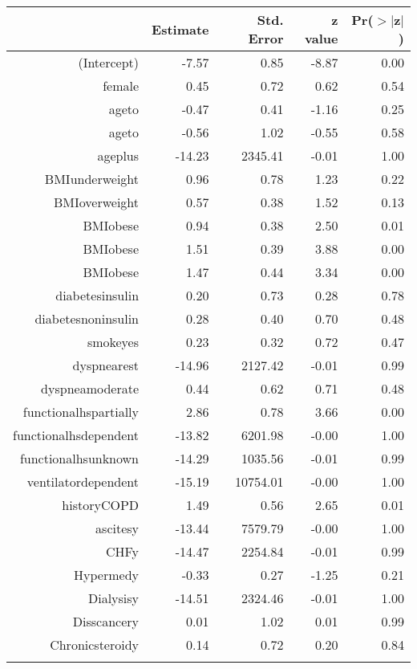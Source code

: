 \bigskip\bigskip
\centering
\begin{tabular}{rrrrr}
  \hline
 & Estimate & Std. Error & z value & Pr($>$$|$z$|$) \\ 
  \hline
(Intercept) & -7.57 & 0.85 & -8.87 & 0.00 \\ 
  female & 0.45 & 0.72 & 0.62 & 0.54 \\ 
  age\-65\-to\-74 & -0.47 & 0.41 & -1.16 & 0.25 \\ 
  age\-75\-to\-84 & -0.56 & 1.02 & -0.55 & 0.58 \\ 
  age\-85\-plus & -14.23 & 2345.41 & -0.01 & 1.00 \\ 
  BMI\-underweight & 0.96 & 0.78 & 1.23 & 0.22 \\ 
  BMI\-overweight & 0.57 & 0.38 & 1.52 & 0.13 \\ 
  BMI\-obese\-1 & 0.94 & 0.38 & 2.50 & 0.01 \\ 
  BMI\-obese\-2 & 1.51 & 0.39 & 3.88 & 0.00 \\ 
  BMI\-obese\-3 & 1.47 & 0.44 & 3.34 & 0.00 \\ 
  diabetes\-insulin & 0.20 & 0.73 & 0.28 & 0.78 \\ 
  diabetes\-noninsulin & 0.28 & 0.40 & 0.70 & 0.48 \\ 
  smoke\-yes & 0.23 & 0.32 & 0.72 & 0.47 \\ 
  dyspnea\-rest & -14.96 & 2127.42 & -0.01 & 0.99 \\ 
  dyspnea\-moderate & 0.44 & 0.62 & 0.71 & 0.48 \\ 
  functional\-hs\-partially & 2.86 & 0.78 & 3.66 & 0.00 \\ 
  functional\-hs\-dependent & -13.82 & 6201.98 & -0.00 & 1.00 \\ 
  functional\-hs\-unknown & -14.29 & 1035.56 & -0.01 & 0.99 \\ 
  ventilator\-dependent & -15.19 & 10754.01 & -0.00 & 1.00 \\ 
  history\-COPD & 1.49 & 0.56 & 2.65 & 0.01 \\ 
  ascites\-y & -13.44 & 7579.79 & -0.00 & 1.00 \\ 
  CHF\-y & -14.47 & 2254.84 & -0.01 & 0.99 \\ 
  Hyper\-med\-y & -0.33 & 0.27 & -1.25 & 0.21 \\ 
  Dialysis\-y & -14.51 & 2324.46 & -0.01 & 1.00 \\ 
  Diss\-cancer\-y & 0.01 & 1.02 & 0.01 & 0.99 \\ 
  Chronic\-steroid\-y & 0.14 & 0.72 & 0.20 & 0.84 \\ 
$$
\end{tabular}
